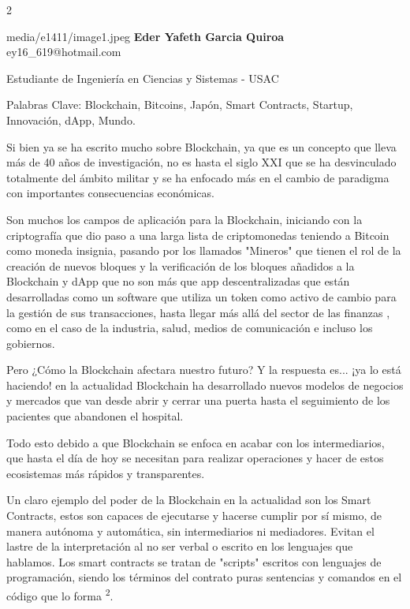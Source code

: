 \documentclass[12pt,spanish,Letterpaper,openany]{book}
\let\BeginKnitrBlock\begin \let\EndKnitrBlock\end
\begin{document}
\begin {multicols}{2}

\BeginKnitrBlock{photobiography3}{media/e1411/image1.jpeg}
\textbf{Eder Yafeth Garcia Quiroa}\\
ey16\_619@hotmail.com

\medskip

Estudiante de Ingeniería en Ciencias y Sistemas - USAC\\

\medskip

Palabras Clave: Blockchain, Bitcoins, Japón, Smart Contracts, Startup, Innovación, dApp, Mundo.
\EndKnitrBlock{photobiography3}

Si bien ya se ha escrito mucho sobre Blockchain, ya que es un concepto que lleva más de 40 años de investigación, no es hasta el siglo XXI que se ha desvinculado totalmente del ámbito militar y se ha enfocado más en el cambio de paradigma con importantes consecuencias económicas.

Son muchos los campos de aplicación para la Blockchain, iniciando con la criptografía que dio paso a una larga lista de criptomonedas teniendo a Bitcoin como moneda insignia, pasando por los llamados "Mineros" que tienen el rol de la creación de nuevos bloques y la verificación de los bloques añadidos a la Blockchain y dApp que no son más que app descentralizadas que están desarrolladas como un software que utiliza un token como activo de cambio para la gestión de sus transacciones, hasta llegar más allá del sector de las finanzas , como en el caso de la industria, salud, medios de comunicación e incluso los gobiernos.

Pero ¿Cómo la Blockchain afectara nuestro futuro? Y la respuesta es... ¡ya lo está haciendo! en la actualidad Blockchain ha desarrollado nuevos modelos de negocios y mercados que van desde abrir y cerrar una puerta hasta el seguimiento de los pacientes que abandonen el hospital.

Todo esto debido a que Blockchain se enfoca en acabar con los intermediarios, que hasta el día de hoy se necesitan para realizar operaciones y hacer de estos ecosistemas más rápidos y transparentes.

Un claro ejemplo del poder de la Blockchain en la actualidad son los Smart Contracts, estos son capaces de ejecutarse y hacerse cumplir por sí mismo, de manera autónoma y automática, sin intermediarios ni mediadores. Evitan el lastre de la interpretación al no ser verbal o escrito en los lenguajes que hablamos. Los smart contracts se tratan de "scripts" escritos con lenguajes de programación, siendo los términos del contrato puras sentencias y comandos en el código que lo forma \textsuperscript{2}.


\end{multicols}
\end{document}
